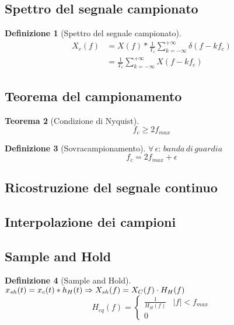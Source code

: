 \documentclass[a4paper,10pt]{article}
\theoremstyle{mystyle}
\newtheorem{theorem}{Teorema}[section]
\newtheorem{definition}[theorem]{Definizione}
\begin{document}
\subsection{Spettro del segnale campionato}
\begin{definition}[Spettro del segnale campionato]
    \[
        \begin{aligned}
            X_c(f)
            &= X(f) * \frac{1}{T_c} \sum_{k=-\infty}^{+\infty} \delta (f-kf_c)  \\
            &= \frac{1}{T_c} \sum_{k=-\infty}^{+\infty} X(f-kf_c)
        \end{aligned}
    \]
\end{definition}

\subsection{Teorema del campionamento}
\begin{theorem}[Condizione di Nyquist]
    \[f_c \geq 2 f_{max}\]
\end{theorem}

\begin{definition}[Sovracampionamento]
    \(\forall \, \epsilon : \, banda\,di\,guardia\)
    \[f_c = 2 f_{max} + \epsilon\]
\end{definition}

\subsection{Ricostruzione del segnale continuo}

\subsection{Interpolazione dei campioni}

\subsection{Sample and Hold}
\begin{definition}[Sample and Hold]
    \(
        x_{sh}(t)=x_c(t)*h_H(t)\\
        \Rightarrow X_{sh}(f) = X_C(f) \cdot H_H (f)
    \)
    \[
        H_{eq}(f) =
        \begin{cases}
            \frac{1}{H_H(f)} & \lvert f \rvert < f_{max} \\
            0    
        \end{cases}
    \]
\end{definition}
\end{document}
